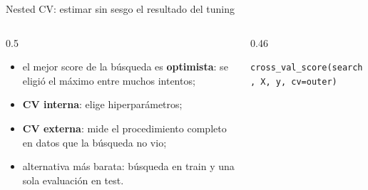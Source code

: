 \documentclass[aspectratio=169,12pt]{beamer}
\begin{document}
\begin{frame}{Nested CV: estimar sin sesgo el resultado del tuning}
  \begin{columns}[c]
    \begin{column}{0.5\textwidth}
      \small
      \begin{itemize}
        \item el mejor score de la búsqueda es \textbf{optimista}: se eligió el máximo entre muchos intentos;
        \item \textbf{CV interna}: elige hiperparámetros;
        \item \textbf{CV externa}: mide el procedimiento completo en datos que la búsqueda no vio;
        \item alternativa más barata: búsqueda en train y una sola evaluación en test.
      \end{itemize}
    \end{column}
    \begin{column}{0.46\textwidth}
      \centering
      \par\vspace{2pt}
      \footnotesize\texttt{cross\_val\_score(search, X, y, cv=outer)}
    \end{column}
  \end{columns}
\end{frame}
\end{document}
